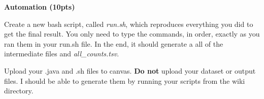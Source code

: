 \documentclass[10pt]{article}
\newenvironment{problem}[2][Problem]{\begin{trivlist}

\item[\hskip \labelsep {\bfseries #1}\hskip \labelsep {\bfseries #2.}]}{\end{trivlist}}
\begin{document}
\begin{problem}{Part 5} 

\textbf{Automation (10pts)}

Create a new bash script, called \textit{run.sh}, which reproduces everything you did to get the final result.  You only need to type the commands, in order, exactly as you ran them in your run.sh file.  In the end, it should generate a all of the intermediate files and \textit{all\_counts.tsv}.



Upload your .java and .sh files to canvas. \textbf{Do not} upload your dataset or output files.  I should be able to generate them by running your scripts from the wiki directory.

\end{problem}
\end{document}
